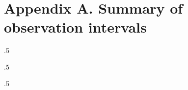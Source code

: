 \chapter{Appendix A. Summary of observation intervals}\label{appendix:observation-periods}

\renewcommand{\thechapter}{A}
\setcounter{table}{0}
\renewcommand{\thetable}{A.\arabic{table}}

\begin{landscape}
\begin{spacing}{.5}
    
    \label{tab:msh-observations}
\end{spacing}
\end{landscape}

\begin{landscape}
\begin{spacing}{.5}
    
    \label{tab:sw-observations}
\end{spacing}
\end{landscape}

\begin{landscape}
\begin{spacing}{.5}
    \setlength{\tabcolsep}{2.5pt}
    
    \label{tab:coordinated-observations}
\end{spacing}
\end{landscape}